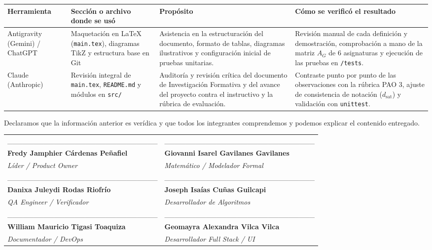 \documentclass[12pt,a4paper]{article}
\theoremstyle{definition}
\begin{document}
\begin{singlespace}
\scriptsize
\begin{table}[H]
\centering
\setlength{\tabcolsep}{4pt}
\renewcommand{\arraystretch}{1.25}
\begin{tabularx}{\textwidth}{|L{2.7cm}|L{3.2cm}|Y|Y|}
\hline
{}
\textbf{Herramienta} & \textbf{Sección o archivo donde se usó} & \textbf{Propósito} & \textbf{Cómo se verificó el resultado} \\ \hline
Antigravity (Gemini) / ChatGPT & Maquetación en \LaTeX{} (\texttt{main.tex}), diagramas TikZ y estructura base en Git & Asistencia en la estructuración del documento, formato de tablas, diagramas ilustrativos y configuración inicial de pruebas unitarias. & Revisión manual de cada definición y demostración, comprobación a mano de la matriz $A_G$ de 6 asignaturas y ejecución de las pruebas en \texttt{/tests}. \\ \hline
Claude (Anthropic) & Revisión integral de \texttt{main.tex}, \texttt{README.md} y módulos en \texttt{src/} & Auditoría y revisión crítica del documento de Investigación Formativa y del avance del proyecto contra el instructivo y la rúbrica de evaluación. & Contraste punto por punto de las observaciones con la rúbrica PAO 3, ajuste de consistencia de notación ($d_{\text{sat}}$) y validación con \texttt{unittest}. \\ \hline
\end{tabularx}
\end{table}

\vspace{0.3cm}
\footnotesize
\noindent Declaramos que la información anterior es verídica y que todos los integrantes comprendemos y podemos explicar el contenido entregado.\\[0.8cm]

\begin{tabularx}{\textwidth}{YY}
\_\_\_\_\_\_\_\_\_\_\_\_\_\_\_\_\_\_\_\_\_\_\_\_\_\_\_\_\_ & \_\_\_\_\_\_\_\_\_\_\_\_\_\_\_\_\_\_\_\_\_\_\_\_\_\_\_\_\_ \\
\textbf{Fredy Jamphier Cárdenas Peñafiel} & \textbf{Giovanni Isarel Gavilanes Gavilanes} \\
\textit{Líder / Product Owner} & \textit{Matemático / Modelador Formal} \\[0.6cm]
\_\_\_\_\_\_\_\_\_\_\_\_\_\_\_\_\_\_\_\_\_\_\_\_\_\_\_\_\_ & \_\_\_\_\_\_\_\_\_\_\_\_\_\_\_\_\_\_\_\_\_\_\_\_\_\_\_\_\_ \\
\textbf{Danixa Juleydi Rodas Riofrío} & \textbf{Joseph Isaías Cuñas Guilcapi} \\
\textit{QA Engineer / Verificador} & \textit{Desarrollador de Algoritmos} \\[0.6cm]
\_\_\_\_\_\_\_\_\_\_\_\_\_\_\_\_\_\_\_\_\_\_\_\_\_\_\_\_\_ & \_\_\_\_\_\_\_\_\_\_\_\_\_\_\_\_\_\_\_\_\_\_\_\_\_\_\_\_\_ \\
\textbf{William Mauricio Tigasi Toaquiza} & \textbf{Geomayra Alexandra Vilca Vilca} \\
\textit{Documentador / DevOps} & \textit{Desarrollador Full Stack / UI} \\
\end{tabularx}
\end{singlespace}
\end{document}
